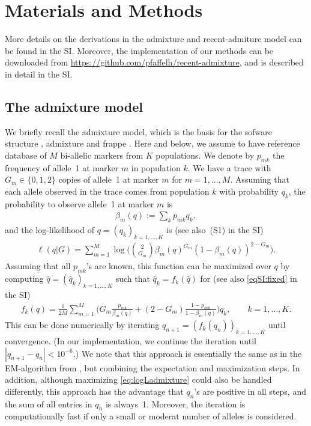 \documentclass[12pt]{article}
\theoremstyle{definition}
\begin{document}
\section{Materials and Methods}
\sloppy More details on the derivations in the admixture and
recent-admiture model can be found in the SI. Moreover, the
implementation of our methods can be downloaded from \url{
  https://github.com/pfaffelh/recent-admixture}, and is described in
detail in the SI.

\subsection{The admixture model}
We briefly recall the admixture model, which is the basis for the
sofware {\sc structure} \cite{Pritchard2000}, {\sc admixture}
\cite{Alexander2009} and {\sc frappe} \cite{Tang2005}.  Here and
below, we assume to have reference database of $M$ bi-allelic markers
from $K$ populations. We denote by $p_{mk}$ the frequency of allele~1
at marker $m$ in population $k$. We have a trace with
$G_m \in \{0,1,2\}$ copies of allele~1 at marker $m$ for
$m=1,...,M$. Assuming that each allele observed in the trace comes
from population $k$ with probability $q_k$, the probability to observe
allele~1 at marker $m$ is
\begin{align}
  \label{eq:beta}
  \beta_m(q) := \sum_k p_{mk} q_k,  
\end{align}
and the log-likelihood of $q = (q_k)_{k=1,...,K}$ is (see also~(S1) in
the SI)
\begin{align}\label{eq:logLadmixture}
  \ell(q|G) = \sum_{m=1}^M \log\Big(\binom{2}{G_m} \beta_m(q)^{G_m}(1-\beta_m(q))^{2-G_m}\Big).
\end{align}
Assuming that all $p_{mk}$'s are known, this function can be maximized
over $q$ by computing $\hat q = (\hat q_k)_{k=1,...,K}$ such that
$\hat q_k = f_k(\hat q)$ for (see also \eqref{eqSI:fixed} in the SI)
\begin{align}\label{eq:fixed}
  f_k(q) =
  \frac{1}{2M} \sum_{m=1}^M \Big(G_m \frac{p_{mk}}{\beta_m(q)} + (2-G_m)\frac{1-p_{mk}}{1-\beta_m(q)}\Big)q_k,
  \qquad k =1,...,K.
\end{align}
This can be done numerically by iterating
$q_{n+1} = (f_k(q_n))_{k=1,...,K}$ until convergence. (In our
implementation, we continue the iteration until
$|q_{n+1} - q_n|< 10^{-6}$.) We note that this approach is essentially
the same as in the EM-algorithm from \cite{Tang2005}, but combining
the expectation and maximization steps. In addition, although
maximizing \eqref{eq:logLadmixture} could also be handled differently,
this approach has the advantage that $q_n$'s are positive in all
steps, and the sum of all entries in $q_n$ is always~1. Moreover, the
iteration is computationally fast if only a small or moderat number of
alleles is considered.
\end{document}

